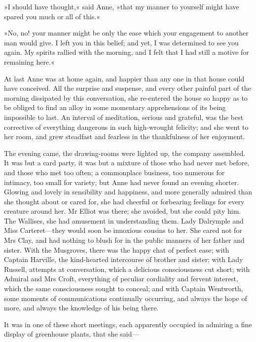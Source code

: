 »I should have thought,« said Anne, »that my manner to yourself might have spared you much or all of this.«

»No, no! your manner might be only the ease which your engagement to another man would give. I left you in this belief; and yet, I was determined to see you again. My spirits rallied with the morning, and I felt that I had still a motive for remaining here.«

At last Anne was at home again, and happier than any one in that house could have conceived. All the surprise and suspense, and every other painful part of the morning dissipated by this conversation, she re-entered the house so happy as to be obliged to find an alloy in some momentary apprehensions of its being impossible to last. An interval of meditation, serious and grateful, was the best corrective of everything dangerous in such high-wrought felicity; and she went to her room, and grew steadfast and fearless in the thankfulness of her enjoyment.

The evening came, the drawing-rooms were lighted up, the company assembled. It was but a card party, it was but a mixture of those who had never met before, and those who met too often; a commonplace business, too numerous for intimacy, too small for variety; but Anne had never found an evening shorter. Glowing and lovely in sensibility and happiness, and more generally admired than she thought about or cared for, she had cheerful or forbearing feelings for every creature around her. Mr Elliot was there; she avoided, but she could pity him. The Wallises, she had amusement in understanding them. Lady Dalrymple and Miss Carteret—they would soon be innoxious cousins to her. She cared not for Mrs Clay, and had nothing to blush for in the public manners of her father and sister. With the Musgroves, there was the happy chat of perfect ease; with Captain Harville, the kind-hearted intercourse of brother and sister; with Lady Russell, attempts at conversation, which a delicious consciousness cut short; with Admiral and Mrs Croft, everything of peculiar cordiality and fervent interest, which the same consciousness sought to conceal; and with Captain Wentworth, some moments of communications continually occurring, and always the hope of more, and always the knowledge of his being there.

It was in one of these short meetings, each apparently occupied in admiring a fine display of greenhouse plants, that she said—

